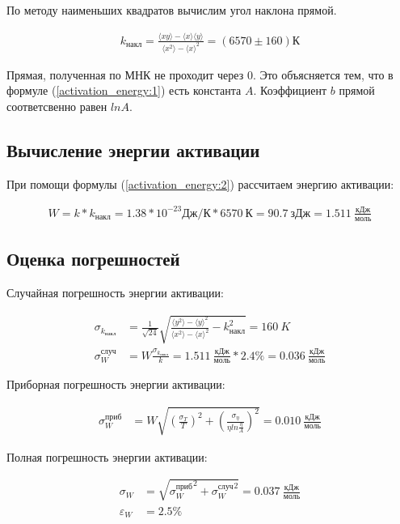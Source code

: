 \documentclass[a4paper, 12pt]{article}
\begin{document}
    По методу наименьших квадратов вычислим угол наклона прямой.

    \begin{align*}
        k_{накл} = \frac{\langle xy \rangle - \langle x \rangle \langle y \rangle}{\langle x^2 \rangle - \langle x \rangle^2} = (6570 \pm 160) К
    \end{align*}

    Прямая, полученная по МНК не проходит через 0. Это объясняется тем, что в формуле (\ref{activation_energy:1}) есть константа $A$. Коэффициент $b$ прямой соответсвенно равен $lnA$.

    \subsection{Вычисление энергии активации}

    При помощи формулы (\ref{activation_energy:2}) рассчитаем энергию активации:

    \begin{align*}
        W = k * k_{накл} = 1.38 * 10^{-23} Дж/К * 6570~К = 90.7~зДж = 1.511~\frac{кДж}{моль}
    \end{align*}

    \subsection{Оценка погрешностей}

    Случайная погрешность энергии активации:

    \begin{align*}
        \sigma_{k_{накл}} &= \frac{1}{\sqrt{24}} \sqrt{\frac{\langle y^2 \rangle - {\langle y \rangle}^2}{\langle x^2 \rangle - {\langle x \rangle}^2} - k_{накл}^2} = 160~K\\
        \sigma_W^{случ} &= W \frac{\sigma_{k_{накл}}}{k} = 1.511~\frac{кДж}{моль} * 2.4\% = 0.036~\frac{кДж}{моль}
    \end{align*}

    Приборная погрешность энергии активации:

    \begin{align*}
        \sigma_W^{приб} &= W \sqrt{\left( \frac{\sigma_T}{T} \right)^2 + \left( \frac{\sigma_{\eta}}{\eta ln \frac{\eta}{A}} \right)^2} = 0.010~\frac{кДж}{моль}
    \end{align*}

    Полная погрешность энергии активации:

    \begin{align*}
        \sigma_W &= \sqrt{{\sigma_W^{приб}}^2 + {\sigma_W^{случ}}^2} = 0.037~\frac{кДж}{моль}\\
        \varepsilon_W &= 2.5\%
    \end{align*}
\end{document}
